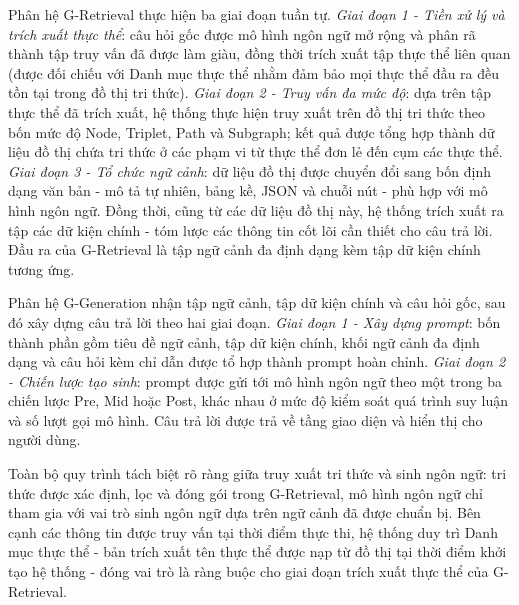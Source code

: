 Phân hệ G-Retrieval thực hiện ba giai đoạn tuần tự. \textit{Giai đoạn 1 - Tiền xử lý và trích xuất thực thể}: câu hỏi gốc được mô hình ngôn ngữ mở rộng và phân rã thành tập truy vấn đã được làm giàu, đồng thời trích xuất tập thực thể liên quan (được đối chiếu với Danh mục thực thể nhằm đảm bảo mọi thực thể đầu ra đều tồn tại trong đồ thị tri thức). \textit{Giai đoạn 2 - Truy vấn đa mức độ}: dựa trên tập thực thể đã trích xuất, hệ thống thực hiện truy xuất trên đồ thị tri thức theo bốn mức độ Node, Triplet, Path và Subgraph; kết quả được tổng hợp thành dữ liệu đồ thị chứa tri thức ở các phạm vi từ thực thể đơn lẻ đến cụm các thực thể. \textit{Giai đoạn 3 - Tổ chức ngữ cảnh}: dữ liệu đồ thị được chuyển đổi sang bốn định dạng văn bản - mô tả tự nhiên, bảng kề, JSON và chuỗi nút - phù hợp với mô hình ngôn ngữ. Đồng thời, cũng từ các dữ liệu đồ thị này, hệ thống trích xuất ra tập các dữ kiện chính - tóm lược các thông tin cốt lõi cần thiết cho câu trả lời. Đầu ra của G-Retrieval là tập ngữ cảnh đa định dạng kèm tập dữ kiện chính tương ứng.

Phân hệ G-Generation nhận tập ngữ cảnh, tập dữ kiện chính và câu hỏi gốc, sau đó xây dựng câu trả lời theo hai giai đoạn. \textit{Giai đoạn 1 - Xây dựng prompt}: bốn thành phần gồm tiêu đề ngữ cảnh, tập dữ kiện chính, khối ngữ cảnh đa định dạng và câu hỏi kèm chỉ dẫn được tổ hợp thành prompt hoàn chỉnh. \textit{Giai đoạn 2 - Chiến lược tạo sinh}: prompt được gửi tới mô hình ngôn ngữ theo một trong ba chiến lược Pre, Mid hoặc Post, khác nhau ở mức độ kiểm soát quá trình suy luận và số lượt gọi mô hình. Câu trả lời được trả về tầng giao diện và hiển thị cho người dùng.

Toàn bộ quy trình tách biệt rõ ràng giữa truy xuất tri thức và sinh ngôn ngữ: tri thức được xác định, lọc và đóng gói trong G-Retrieval, mô hình ngôn ngữ chỉ tham gia với vai trò sinh ngôn ngữ dựa trên ngữ cảnh đã được chuẩn bị. Bên cạnh các thông tin được truy vấn tại thời điểm thực thi, hệ thống duy trì Danh mục thực thể - bản trích xuất tên thực thể được nạp từ đồ thị tại thời điểm khởi tạo hệ thống - đóng vai trò là ràng buộc cho giai đoạn trích xuất thực thể của G-Retrieval.
